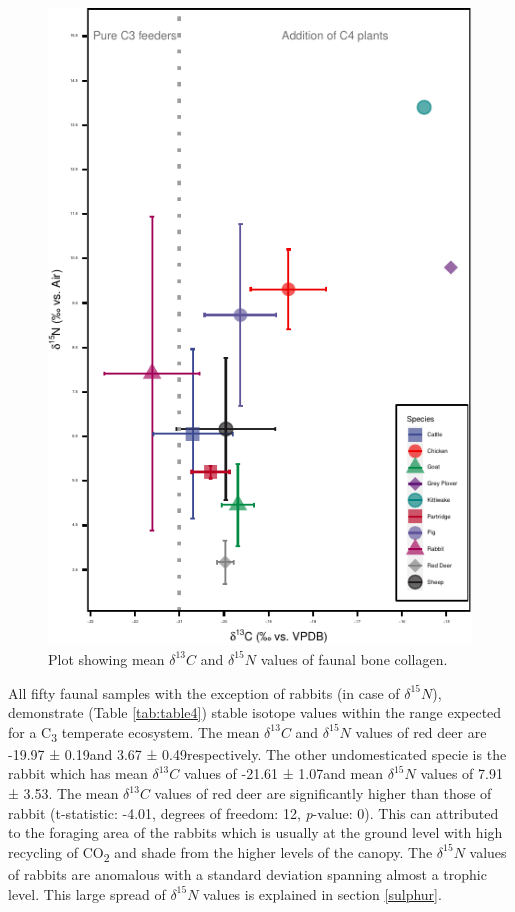 \documentclass[5p]{elsarticle} %
\begin{document}
\begin{figure}
\centering
\includegraphics{castro_main_body_files/figure-latex/fauna-carbnitro-iso-plot-1.pdf}
\caption{\label{fig:fauna-carbnitro-iso-plot}Plot showing mean \(\delta ^{13}C\) and \(\delta ^{15}N\) values of faunal bone collagen.}
\end{figure}

All fifty faunal samples with the exception of rabbits (in case of \(\delta ^{15}N\)), demonstrate (Table \ref{tab:table4}) stable isotope values within the range expected for a C\textsubscript{3} temperate ecosystem. The mean \(\delta ^{13}C\) and \(\delta ^{15}N\) values of red deer are -19.97 ± 0.19\permil and 3.67 ± 0.49\permil respectively. The other undomesticated specie is the rabbit which has mean \(\delta ^{13}C\) values of -21.61 ± 1.07\permil and mean \(\delta ^{15}N\) values of 7.91 ± 3.53\permil. The mean \(\delta ^{13}C\) values of red deer are significantly higher than those of rabbit (t-statistic: -4.01, degrees of freedom: 12, \emph{p}-value: 0). This can attributed to the foraging area of the rabbits which is usually at the ground level with high recycling of CO\textsubscript{2} and shade from the higher levels of the canopy. The \(\delta ^{15}N\) values of rabbits are anomalous with a standard deviation spanning almost a trophic level. This large spread of \(\delta ^{15}N\) values is explained in section \ref{sulphur}.
\end{document}
